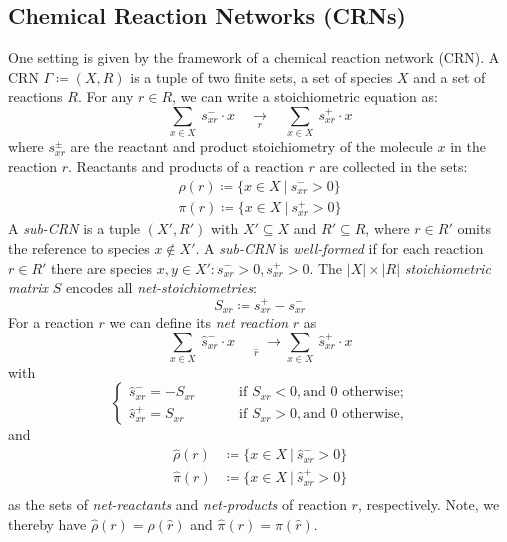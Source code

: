 \documentclass[pdflatex]{sn-jnl}
\theoremstyle{thmstyleone}%
\theoremstyle{examplesty}%
\theoremstyle{thmstylethree}%
\newcommand{\SM}{S}
\newcommand{\CR}[0]{R}
\newcommand{\net}[1]{\hat{#1}}
\newcommand{\ceducts}{\rho}
\newcommand{\cproducts}{\pi}
\newcommand{\NV}[1]{\begingroup\color{teal}#1\endgroup}
\begin{document}
\subsection{Chemical Reaction Networks (CRNs)}

\NV{One} setting is given by the framework of a chemical reaction
network (CRN).  A CRN $\Gamma \coloneqq (X,\CR)$ is a tuple of two finite
sets, a set of species $X$ and a set of reactions $\CR$. For any $r\in
\CR$, we can write a stoichiometric equation as:
\begin{equation}\label{eq:reaction}
  \sum_{x\in X}\ s^-_{xr} \cdot x \quad\underset{r}\rightarrow \quad \sum_{x\in X} \ s^+_{xr}\cdot x
\end{equation}
where $s^{\pm}_{xr}$ are the reactant and product stoichiometry of the
molecule $x$ in the reaction $r$. Reactants and products \NV{of a reaction $r$} are collected in
the sets:
\begin{equation}
  \begin{split}
    \ceducts(r) \coloneqq \{x\in X \ \vert \ s^-_{xr}>0\} \\
    \cproducts(r) \coloneqq \{x\in X \ \vert \ s^+_{xr}>0\} 
  \end{split}
\end{equation}
A \emph{sub-CRN} is a tuple $(X',R')$ with $X'\subseteq X$ and $R'\subseteq
R$, \NV{where $r\in R'$ omits the reference to species $x\not\in X'$}. A 
\emph{sub-CRN} is \emph{well-formed} if for each reaction $r\in R'$
there are species $x,y\in X': s^-_{xr}>0, s^+_{xr}>0$.  The $|X|\times|R|$
\emph{stoichiometric matrix} $\SM$ encodes all \emph{net-stoichiometries}:
\begin{equation}
  \SM_{xr}\coloneqq s^+_{xr}-s^-_{xr}
\end{equation}
For a reaction $r$ we can define its \emph{net reaction} $\net{r}$ as
\begin{equation}\label{eq:NetReaction}
  \sum_{x\in X}\ \net{s}^-_{xr} \cdot x\quad\underset{\net{r}} \quad \rightarrow \sum_{x\in X}
  \ \net{s}^+_{xr}\cdot x 
\end{equation}
with 
\begin{equation}
\begin{cases}
    \net{s}^-_{xr} = -\SM_{xr}  \qquad &\text{ if } \SM_{xr} < 0, \text{and } 0 \text{ otherwise;}\\
    \net{s}^+_{xr} = \SM_{xr}  \qquad &\text{ if } \SM_{xr}> 0, \text{and } 0 \text{ otherwise,}   
  \end{cases}
\end{equation}
and
\begin{equation}
  \begin{split}
   \net{\ceducts}(r) & \coloneqq \{x\in X \ \vert \ \net{s}^-_{xr}>0\} \\
   \net{\cproducts}(r) & \coloneqq \{x\in X \ \vert \ \net{s}^+_{xr}>0\} \\
  \end{split}
\end{equation}
as the sets of \emph{net-reactants} and \emph{net-products} of reaction $r$,
respectively. Note, we thereby have $\net{\ceducts}(r) = \ceducts(\net{r})$
and $\net{\cproducts}(r) = \cproducts(\net{r})$.
\end{document}
